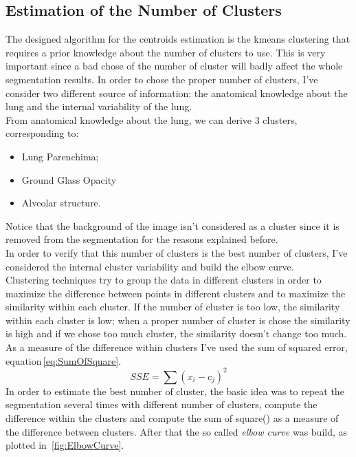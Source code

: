 \documentclass{standalone}
\begin{document}
	\subsection{Estimation of the Number of Clusters}
	
	The designed algorithm for the centroids estimation is the kmeans clustering that requires a prior knowledge about the number of clusters to use. This is very important since a bad chose of the number of cluster will badly affect the whole segmentation results. In order to chose the proper number of clusters, I've consider two different source of information: the anatomical knowledge about the lung and the internal variability of the lung. \\
	From anatomical knowledge about the lung, we can derive 3 clusters, corresponding to: 
	
	\begin{itemize}
		\item Lung Parenchima; 
		
		\item Ground Glass Opacity
		
		\item Alveolar structure. 
		
	\end{itemize}

	Notice that the background of the image isn't considered as a cluster since it is removed from the segmentation for the reasons explained before.\\
	In order to verify that this number of clusters is the best number of clusters, I've considered the internal cluster variability and build the elbow curve.\\
	Clustering techniques try to group the data in different clusters  in order to maximize the difference between points in different clusters and to maximize the similarity within each cluster. If the number of cluster is too low, the similarity within each cluster is low; when a proper number of cluster is chose the similarity is high and if we chose too much cluster, the similarity doesn't change too much.\\
	As a measure of the difference within clusters I've used the sum of squared error, equation\,\ref{eq:SumOfSquare}. 
	\begin{equation}\label{eq:SumOfSquare}
		SSE = \sum (x_i - c_j)^2
	\end{equation}
	In order to estimate the best number of cluster, the basic idea was to repeat the segmentation several times with different number of clusters, compute the difference within the clusters and compute the sum of square() as a measure of the difference between clusters. After that the so called \emph{elbow curve} was build, as plotted in \figurename\,\ref{fig:ElbowCurve}.
	
\end{document}
